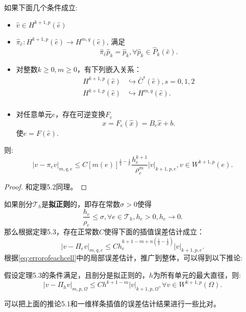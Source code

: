 \begin{theorem}
    如果下面几个条件成立:
    \begin{itemize}
        \item $\hat{v}\in H^{k+1,p}(\hat{e})$
        \item $\hat{\pi}_{\hat{e}}:H^{k+1,p}(\hat{e})\rightarrow H^{m,q}(\hat{e})$, 满足
        \begin{equation}
            \hat{\pi}_{\hat{e}}\hat{p}_{k}=\hat{p}_{k},\forall\hat{p}_{k}\in\hat{P}_{k}(\hat{e}).
        \end{equation}
        \item 对整数$k\ge 0,m\ge 0$，有下列嵌入关系：
        \begin{equation}
            \begin{aligned}
                H^{k+1,p}(\hat{e})&\hookrightarrow \bar{C}^{s}(\hat{e}),s=0,1,2\\
                H^{k+1,p}(\hat{e})&\hookrightarrow H^{m,q}(\hat{e}).\\
            \end{aligned}
        \end{equation}
        \item 对任意单元$e$，存在可逆变换$F_{e}$
        \begin{equation}
            x=F_{e}(\hat{x})=B_{e}\hat{x}+b.
        \end{equation}
        使$e=F(\hat{e})$.
    \end{itemize}
    则:
    \begin{equation}
        |v-\pi_{e}v|_{m,q,e}\le C\left[m(e)\right]^{\frac{1}{q}-\frac{1}{p}}\frac{h_{e}^{k+1}}{\rho_{e}^{m}}|v|_{k+1,p,e},v\in W^{k+1,p}(e).
    \end{equation}
\end{theorem}
\begin{proof}
    和定理5.2同理。
\end{proof}
如果剖分$\mathcal{T}_{h}$是\textbf{拟正则}的，即存在常数$\sigma>0$使得
\begin{equation}
    \frac{h_{e}}{\rho_{e}}\le\sigma,\forall e\in\mathcal{T}_{h},h_{e}>0,h_{e}\rightarrow 0.
\end{equation}
那么根据定理5.3，存在正常数$C$使得下面的插值误差估计成立：
\begin{equation}
    \label{eq:errorofeachcell}
    |v-\Pi_{e}v|_{m,q,e}\le Ch_{e}^{k+1-m+n(\frac{1}{q}-\frac{1}{p})}|v|_{k+1,p,e}.
\end{equation}
根据\eqref{eq:errorofeachcell}中的局部误差估计，推广到整体，可以得到以下推论:
\begin{corollary}
    假设定理5.3的条件满足，且剖分是拟正则的，$h$为所有单元的最大直径，则:
    \begin{equation}
        \label{eq:globalanalysis}
        |v-\Pi_{h}v|_{m,p,\Omega}\le Ch^{k+1-m}|v|_{k+1,p,\Omega},\forall v\in W^{k+1,p}(\Omega).
    \end{equation}
\end{corollary}
\begin{remark}
    可以把上面的推论5.1和一维样条插值的误差估计结果进行一些比对。
\end{remark}
